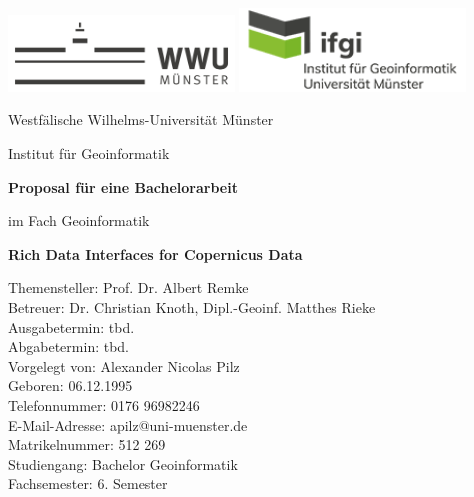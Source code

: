 \documentclass[12pt, a4paper]{article} %
\begin{document}
\thispagestyle{empty}
\begin{center}
\includegraphics[width=6cm]{Bilder/wwu_logo.png} \hspace{1.3cm} 
\includegraphics[width=6cm]{Bilder/ifgi_logo.png}

\vspace{3cm}

Westfälische Wilhelms-Universität Münster

Institut für Geoinformatik 

\vspace{3cm}

\textbf{\large Proposal für eine Bachelorarbeit} 

im Fach Geoinformatik
\vspace{1cm}

\textbf{\large Rich Data Interfaces for Copernicus Data}

\vspace{1cm}


Themensteller: Prof. Dr. Albert Remke\\
Betreuer: Dr. Christian Knoth, Dipl.-Geoinf. Matthes Rieke\\
Ausgabetermin: tbd.\\
Abgabetermin: tbd.\\
\vspace{0.5cm}
Vorgelegt von: Alexander Nicolas Pilz\\
Geboren: 06.12.1995\\
Telefonnummer: 0176 96982246\\
E-Mail-Adresse:	apilz@uni-muenster.de\\
Matrikelnummer: 512 269\\
Studiengang: Bachelor Geoinformatik\\
Fachsemester: 6. Semester\\

\end{center}



\end{document}
